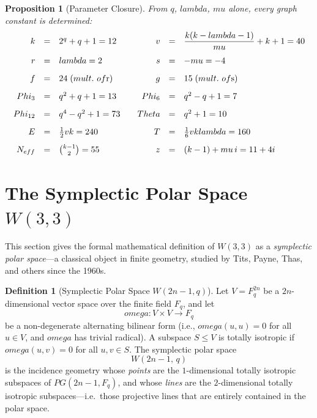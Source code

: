 \documentclass[12pt,a4paper]{article}
\def\mathbb#1{#1}%
\def\mathrm#1{#1}%
\def\textbf#1{#1}%
\def\text#1{#1}%
\def\omega{omega}%
\def\lambda{lambda}%
\def\mu{mu}%
\def\Phi#1{Phi#1}%
\def\Theta{Theta}%
\newtheorem{proposition}[theorem]{Proposition}
\theoremstyle{definition}
\newtheorem{definition}[theorem]{Definition}
\newcommand{\PG}{\mathrm{PG}}
\newcommand{\Phithree}{\Phi_3}
\newcommand{\Phisix}{\Phi_6}
\newcommand{\Phitwelve}{\Phi_{12}}
\newcommand{\Neff}{N_{\mathrm{eff}}}
\newcommand{\FF}{\mathbb{F}}
\begin{document}
\begin{proposition}[Parameter Closure]
\label{prop:params}
From $q$, $\lambda$, $\mu$ alone, every graph constant is determined:
\begin{equation}
\renewcommand{\arraystretch}{1.4}
\begin{array}{rcl@{\qquad}rcl}
k &=& 2^q + q + 1 = 12 &
v &=& \dfrac{k(k-\lambda-1)}{\mu} + k + 1 = 40 \\[6pt]
r &=& \lambda = 2 &
s &=& -\mu = -4 \\[4pt]
f &=& 24 \;\text{(mult.\ of $r$)} &
g &=& 15 \;\text{(mult.\ of $s$)} \\[4pt]
\Phithree &=& q^2+q+1 = 13 &
\Phisix &=& q^2-q+1 = 7 \\[4pt]
\Phitwelve &=& q^4-q^2+1 = 73 &
\Theta &=& q^2+1 = 10 \\[4pt]
E &=& \tfrac{1}{2}vk = 240 &
T &=& \tfrac{1}{6}vk\lambda = 160 \\[4pt]
\Neff &=& \tbinom{k-1}{2} = 55 &
z &=& (k-1)+\mu\,i = 11+4i
\end{array}
\label{eq:params}
\end{equation}
\end{proposition}


\section{\texorpdfstring{The Symplectic Polar Space $W(3,3)$}{The Symplectic Polar Space W(3,3)}}
\label{sec:W33}

This section gives the formal mathematical definition of $W(3,3)$
as a \emph{symplectic polar space}---a classical object in
finite geometry, studied by Tits, Payne, Thas, and others since the
1960s.

\begin{definition}[Symplectic Polar Space $W(2n{-}1,q)$]
\label{def:polar}
Let $V = \FF_q^{2n}$ be a $2n$-dimensional vector space over the
finite field $\FF_q$, and let
\begin{equation}
\omega\colon V \times V \longrightarrow \FF_q
\label{eq:form}
\end{equation}
be a \textbf{non-degenerate alternating bilinear form}
(i.e., $\omega(u,u)=0$ for all $u\in V$, and $\omega$ has trivial
radical).  A subspace $S\leq V$ is \textbf{totally isotropic} if
$\omega(u,v)=0$ for all $u,v\in S$.  The \textbf{symplectic polar space}
\begin{equation}
\boxed{W(2n{-}1,\,q)}
\end{equation}
is the incidence geometry whose \emph{points} are the $1$-dimensional
totally isotropic subspaces of $\PG(2n{-}1,\FF_q)$, and whose
\emph{lines} are the $2$-dimensional totally isotropic subspaces---i.e.\
those projective lines that are entirely contained in the polar space.
\end{definition}
\end{document}
